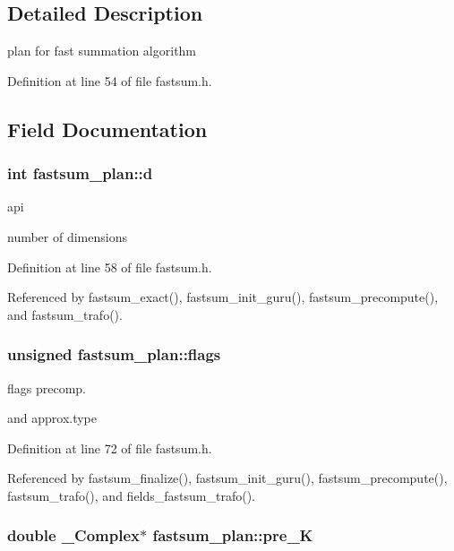 \subsection{Detailed Description}
plan for fast summation algorithm 

Definition at line 54 of file fastsum.h.

\subsection{Field Documentation}
\hypertarget{structfastsum__plan_8c32876370be14f7e88337d979c93382}{
\subsubsection{\setlength{\rightskip}{0pt plus 5cm}int {\bf fastsum\_\-plan::d}}}
\label{structfastsum__plan_8c32876370be14f7e88337d979c93382}


api 

number of dimensions 

Definition at line 58 of file fastsum.h.

Referenced by fastsum\_\-exact(), fastsum\_\-init\_\-guru(), fastsum\_\-precompute(), and fastsum\_\-trafo().\hypertarget{structfastsum__plan_3d264dc33ae01a71908311ac9b7eadc2}{
\subsubsection{\setlength{\rightskip}{0pt plus 5cm}unsigned {\bf fastsum\_\-plan::flags}}}
\label{structfastsum__plan_3d264dc33ae01a71908311ac9b7eadc2}


flags precomp. 

and approx.type 

Definition at line 72 of file fastsum.h.

Referenced by fastsum\_\-finalize(), fastsum\_\-init\_\-guru(), fastsum\_\-precompute(), fastsum\_\-trafo(), and fields\_\-fastsum\_\-trafo().\hypertarget{structfastsum__plan_8dbf6da034fa65b1c2c2d35883a59367}{
\subsubsection{\setlength{\rightskip}{0pt plus 5cm}double \_\-Complex$\ast$ {\bf fastsum\_\-plan::pre\_\-K}}}
\label{structfastsum__plan_8dbf6da034fa65b1c2c2d35883a59367}


